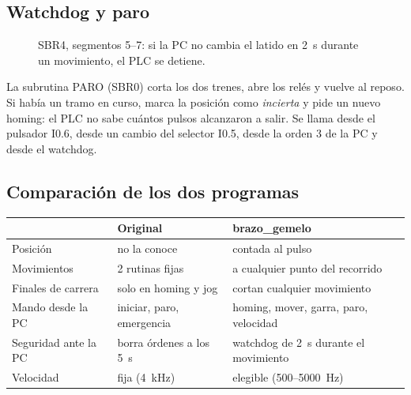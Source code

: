 \documentclass[a4paper,11pt]{article}
\begin{document}
\subsection{Watchdog y paro}
\begin{figure}[H]
\centering
{}
\caption{SBR4, segmentos 5--7: si la PC no cambia el latido en 2~s durante un movimiento, el PLC se detiene.}
\end{figure}

La subrutina PARO (SBR0) corta los dos trenes, abre los relés y vuelve al reposo. Si había un tramo en curso, marca la posición como \emph{incierta} y pide un nuevo homing: el PLC no sabe cuántos pulsos alcanzaron a salir. Se llama desde el pulsador I0.6, desde un cambio del selector I0.5, desde la orden 3 de la PC y desde el watchdog.

\subsection{Comparación de los dos programas}
\begin{center}\small
\begin{tabularx}{\linewidth}{>{\raggedright}p{4cm} >{\raggedright}X >{\raggedright\arraybackslash}X}
\toprule
& \textbf{Original} & \textbf{brazo\_gemelo}\\
\midrule
Posición & no la conoce & contada al pulso\\
Movimientos & 2 rutinas fijas & a cualquier punto del recorrido\\
Finales de carrera & solo en homing y jog & cortan cualquier movimiento\\
Mando desde la PC & iniciar, paro, emergencia & homing, mover, garra, paro, velocidad\\
Seguridad ante la PC & borra órdenes a los 5~s & watchdog de 2~s durante el movimiento\\
Velocidad & fija (4~kHz) & elegible (500--5000~Hz)\\
\bottomrule
\end{tabularx}
\end{center}
\end{document}
